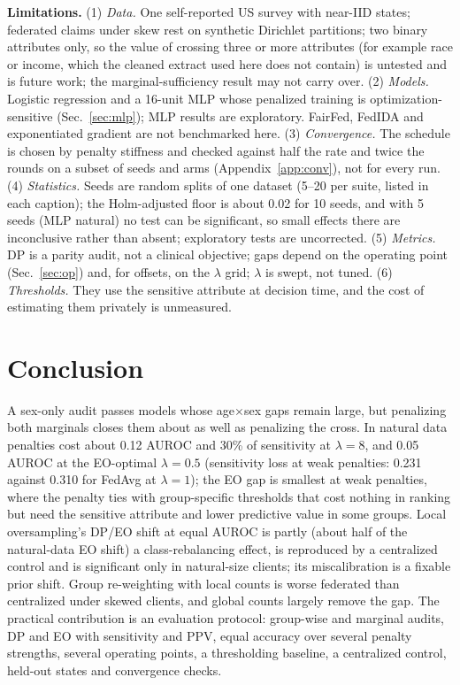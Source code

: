 \textbf{Limitations.} (1) \emph{Data.} One self-reported US survey with near-IID states; federated claims under skew rest on synthetic Dirichlet partitions; two binary attributes only, so the value of crossing three or more attributes (for example race or income, which the cleaned extract used here does not contain) is untested and is future work; the marginal-sufficiency result may not carry over. (2) \emph{Models.} Logistic regression and a 16-unit MLP whose penalized training is optimization-sensitive (Sec.~\ref{sec:mlp}); MLP results are exploratory. FairFed, FedIDA and exponentiated gradient are not benchmarked here. (3) \emph{Convergence.} The schedule is chosen by penalty stiffness and checked against half the rate and twice the rounds on a subset of seeds and arms (Appendix~\ref{app:conv}), not for every run. (4) \emph{Statistics.} Seeds are random splits of one dataset (5--20 per suite, listed in each caption); the Holm-adjusted floor is about 0.02 for 10 seeds, and with 5 seeds (MLP natural) no test can be significant, so small effects there are inconclusive rather than absent; exploratory tests are uncorrected. (5) \emph{Metrics.} DP is a parity audit, not a clinical objective; gaps depend on the operating point (Sec.~\ref{sec:op}) and, for offsets, on the $\lambda$ grid; $\lambda$ is swept, not tuned. (6) \emph{Thresholds.} They use the sensitive attribute at decision time, and the cost of estimating them privately is unmeasured.

\section{Conclusion}
A sex-only audit passes models whose age$\times$sex gaps remain large, but penalizing both marginals closes them about as well as penalizing the cross. In natural data penalties cost about 0.12 AUROC and 30\% of sensitivity at $\lambda{=}8$, and 0.05 AUROC at the EO-optimal $\lambda{=}0.5$ (sensitivity loss at weak penalties: 0.231 against 0.310 for FedAvg at $\lambda{=}1$); the EO gap is smallest at weak penalties, where the penalty ties with group-specific thresholds that cost nothing in ranking but need the sensitive attribute and lower predictive value in some groups. Local oversampling's DP/EO shift at equal AUROC is partly (about half of the natural-data EO shift) a class-rebalancing effect, is reproduced by a centralized control and is significant only in natural-size clients; its miscalibration is a fixable prior shift. Group re-weighting with local counts is worse federated than centralized under skewed clients, and global counts largely remove the gap. The practical contribution is an evaluation protocol: group-wise and marginal audits, DP and EO with sensitivity and PPV, equal accuracy over several penalty strengths, several operating points, a thresholding baseline, a centralized control, held-out states and convergence checks.

\appendices
